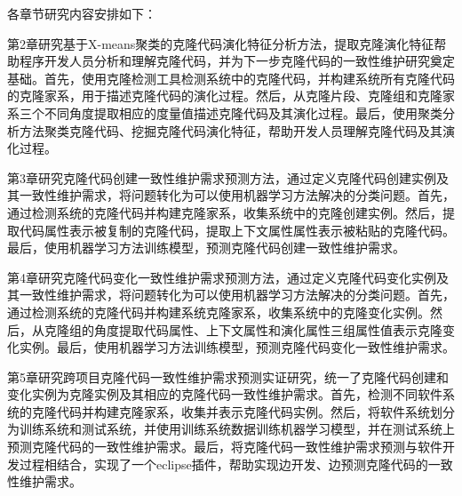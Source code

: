 


各章节研究内容安排如下：

第2章研究基于X-means聚类的克隆代码演化特征分析方法，提取克隆演化特征帮助程序开发人员分析和理解克隆代码，并为下一步克隆代码的一致性维护研究奠定基础。首先，使用克隆检测工具检测系统中的克隆代码，并构建系统所有克隆代码的克隆家系，用于描述克隆代码的演化过程。然后，从克隆片段、克隆组和克隆家系三个不同角度提取相应的度量值描述克隆代码及其演化过程。最后，使用聚类分析方法聚类克隆代码、挖掘克隆代码演化特征，帮助开发人员理解克隆代码及其演化过程。

第3章研究克隆代码创建一致性维护需求预测方法，通过定义克隆代码创建实例及其一致性维护需求，将问题转化为可以使用机器学习方法解决的分类问题。首先，通过检测系统的克隆代码并构建克隆家系，收集系统中的克隆创建实例。然后，提取代码属性表示被复制的克隆代码，提取上下文属性属性表示被粘贴的克隆代码。最后，使用机器学习方法训练模型，预测克隆代码创建一致性维护需求。

第4章研究克隆代码变化一致性维护需求预测方法，通过定义克隆代码变化实例及其一致性维护需求，将问题转化为可以使用机器学习方法解决的分类问题。首先，通过检测系统的克隆代码并构建系统克隆家系，收集系统中的克隆变化实例。然后，从克隆组的角度提取代码属性、上下文属性和演化属性三组属性值表示克隆变化实例。最后，使用机器学习方法训练模型，预测克隆代码变化一致性维护需求。

第5章研究跨项目克隆代码一致性维护需求预测实证研究，统一了克隆代码创建和变化实例为克隆实例及其相应的克隆代码一致性维护需求。首先，检测不同软件系统的克隆代码并构建克隆家系，收集并表示克隆代码实例。然后，将软件系统划分为训练系统和测试系统，并使用训练系统数据训练机器学习模型，并在测试系统上预测克隆代码的一致性维护需求。最后，将克隆代码一致性维护需求预测与软件开发过程相结合，实现了一个eclipse插件，帮助实现边开发、边预测克隆代码的一致性维护需求。
